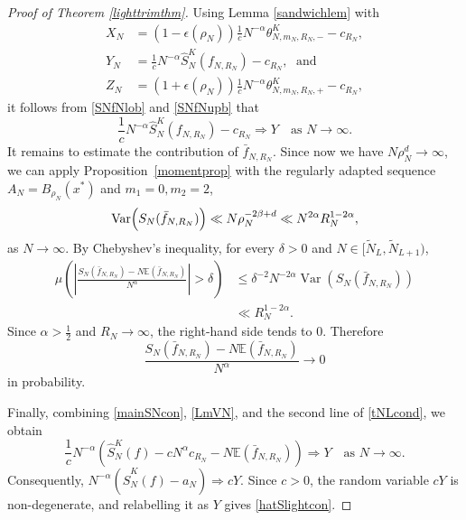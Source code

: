 \documentclass[11pt,twoside,a4paper,reqno]{amsart}
\newcommand{\Var}{\operatorname{Var}}
\newcommand{\as}[1]{\text{as } #1 \rightarrow\infty}
\newcommand{\E}{\mathbb{E}}
\begin{document}
\begin{proof}[Proof of Theorem \ref{lighttrimthm}]
Using Lemma \ref{sandwichlem} with
\begin{align*}
X_N&=\left(1-\epsilon(\rho_N)\right) \frac{1}{c} N^{-\alpha} \theta_{N,m_N,R_N,-}^K - c_{R_N},\\
Y_N&=\frac{1}{c} N^{-\alpha} \hat{S}_N^K(f_{N,R_N}) - c_{R_N},\; \text{ and}\\
Z_N&=\left(1+\epsilon(\rho_N)\right) \frac{1}{c} N^{-\alpha} \theta_{N,m_N,R_N,+}^K - c_{R_N},
\end{align*}
it follows from \eqref{SNfNlob} and \eqref{SNfNupb} that
\begin{equation}\label{mainSNcon}
\frac{1}{c} N^{-\alpha} \hat{S}_N^K(f_{N,R_N}) - c_{R_N} \Rightarrow Y \quad \as{N}.
\end{equation}
It remains to estimate the contribution of $\bar f_{N,R_N}$. Since now we have $N \rho_N^d\rightarrow \infty$, we can apply Proposition~\ref{momentprop} with the regularly adapted sequence $A_N = B_{\rho_N}(x^*)$ and $m_1=0,m_2=2$,
\begin{equation*}
\Var\Bigl(S_N(\bar{f}_{N,R_N})\Bigr) \ll  N \rho_N^{-2\beta + d} \ll N^{2\alpha} R_N^{1 - 2\alpha},
\end{equation*}
as $N\rightarrow \infty$. By Chebyshev's inequality, for every $\delta>0$ and $N\in[\tilde N_L,\tilde N_{L+1})$,
\begin{align*}
\mu\left(\left|\frac{S_N(\bar f_{N,R_N})-N\E(\bar f_{N,R_N})}{N^\alpha}\right|>\delta\right)
&\le\delta^{-2}N^{-2\alpha}\Var\left(S_N(\bar f_{N,R_N})\right)\\
&\ll R_N^{1-2\alpha}.
\end{align*}
Since $\alpha>\frac{1}{2}$ and $R_N\to\infty$, the right-hand side tends to $0$. Therefore
\begin{equation}\label{LmVN}
\frac{S_N(\bar f_{N,R_N})-N\E(\bar f_{N,R_N})}{N^\alpha}
\to0
\end{equation}
in probability.





Finally, combining \eqref{mainSNcon}, \eqref{LmVN}, and the second line of \eqref{tNLcond}, we obtain
\begin{equation*}
\frac{1}{c}N^{-\alpha}\left(\hat S_N^K(f)-cN^\alpha c_{R_N}-N\E(\bar f_{N,R_N})\right)
\Rightarrow Y\quad \as{N}.
\end{equation*}
Consequently,
$N^{-\alpha}\left(\hat S_N^K(f)-a_N\right)\Rightarrow cY.$
Since $c>0$, the random variable $cY$ is non-degenerate, and
relabelling it as $Y$ gives \eqref{hatSlightcon}.



\end{proof}
\end{document}
